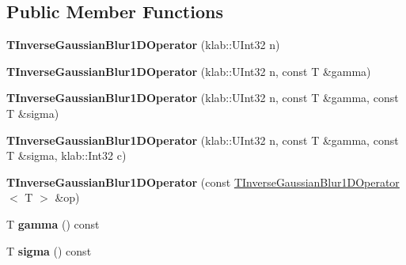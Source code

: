\subsection*{Public Member Functions}
\begin{DoxyCompactItemize}
\item 
{\bfseries T\+Inverse\+Gaussian\+Blur1\+D\+Operator} (klab\+::\+U\+Int32 n)\hypertarget{classkl1p_1_1TInverseGaussianBlur1DOperator_adc9888b26e27749ef1cd278dc56d1e56}{}\label{classkl1p_1_1TInverseGaussianBlur1DOperator_adc9888b26e27749ef1cd278dc56d1e56}

\item 
{\bfseries T\+Inverse\+Gaussian\+Blur1\+D\+Operator} (klab\+::\+U\+Int32 n, const T \&gamma)\hypertarget{classkl1p_1_1TInverseGaussianBlur1DOperator_abd7c27ca5393954e0cc4a6129d66c324}{}\label{classkl1p_1_1TInverseGaussianBlur1DOperator_abd7c27ca5393954e0cc4a6129d66c324}

\item 
{\bfseries T\+Inverse\+Gaussian\+Blur1\+D\+Operator} (klab\+::\+U\+Int32 n, const T \&gamma, const T \&sigma)\hypertarget{classkl1p_1_1TInverseGaussianBlur1DOperator_afbc37b3137ad7d3af9165ebbfe7a7ea8}{}\label{classkl1p_1_1TInverseGaussianBlur1DOperator_afbc37b3137ad7d3af9165ebbfe7a7ea8}

\item 
{\bfseries T\+Inverse\+Gaussian\+Blur1\+D\+Operator} (klab\+::\+U\+Int32 n, const T \&gamma, const T \&sigma, klab\+::\+Int32 c)\hypertarget{classkl1p_1_1TInverseGaussianBlur1DOperator_a4a73c439ae8c4ee1b2f341b9617ec398}{}\label{classkl1p_1_1TInverseGaussianBlur1DOperator_a4a73c439ae8c4ee1b2f341b9617ec398}

\item 
{\bfseries T\+Inverse\+Gaussian\+Blur1\+D\+Operator} (const \hyperlink{classkl1p_1_1TInverseGaussianBlur1DOperator}{T\+Inverse\+Gaussian\+Blur1\+D\+Operator}$<$ T $>$ \&op)\hypertarget{classkl1p_1_1TInverseGaussianBlur1DOperator_ab801858abc35f3decedfdcea5d146f77}{}\label{classkl1p_1_1TInverseGaussianBlur1DOperator_ab801858abc35f3decedfdcea5d146f77}

\item 
T {\bfseries gamma} () const \hypertarget{classkl1p_1_1TInverseGaussianBlur1DOperator_af122a945209780719895afb527caf989}{}\label{classkl1p_1_1TInverseGaussianBlur1DOperator_af122a945209780719895afb527caf989}

\item 
T {\bfseries sigma} () const \hypertarget{classkl1p_1_1TInverseGaussianBlur1DOperator_a72f84a158180d677c0f0fb8232743506}{}\label{classkl1p_1_1TInverseGaussianBlur1DOperator_a72f84a158180d677c0f0fb8232743506}


\end{DoxyCompactItemize}
